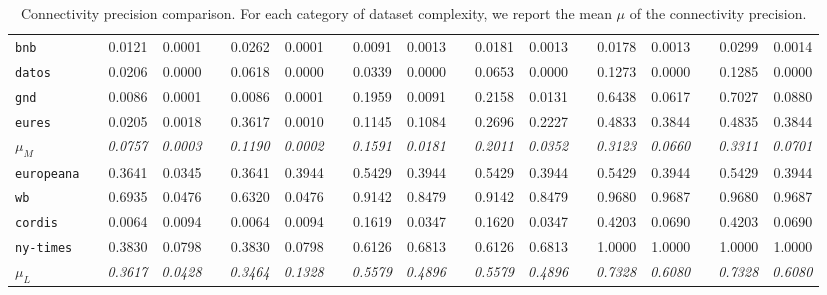 \begin{table}
{\begin{tabular}{lc@{\hs}rrc@{\hs}rrc@{\hs}rrc@{\hs}rrc@{\hs}rrc@{\hs}rr}
\texttt{bnb} & \phantom{a} & 0.0121 & 0.0001 & \phantom{a} & 0.0262 & 0.0001 & \phantom{a} & 0.0091 & 0.0013  & \phantom{a} & 0.0181 & 0.0013 & \phantom{a} & 0.0178 & 0.0013 & \phantom{a} & 0.0299 & 0.0014 \\
\texttt{datos} & \phantom{a} & 0.0206 & 0.0000 & \phantom{a} & 0.0618 & 0.0000 & \phantom{a} & 0.0339 & 0.0000  & \phantom{a} & 0.0653 & 0.0000 & \phantom{a} & 0.1273 & 0.0000 & \phantom{a} & 0.1285 & 0.0000 \\
\texttt{gnd} & \phantom{a} & 0.0086 & 0.0001 & \phantom{a} & 0.0086 & 0.0001 & \phantom{a} & 0.1959 & 0.0091  & \phantom{a} & 0.2158 & 0.0131 & \phantom{a} & 0.6438 & 0.0617 & \phantom{a} & 0.7027 & 0.0880 \\
\texttt{eures} & \phantom{a} & 0.0205 & 0.0018 & \phantom{a} & 0.3617 & 0.0010 & \phantom{a} & 0.1145 & 0.1084  & \phantom{a} & 0.2696 & 0.2227 & \phantom{a} & 0.4833 & 0.3844 & \phantom{a} & 0.4835 & 0.3844 \\
$\mu_M$ & \phantom{a} & \emph{0.0757} & \emph{0.0003} & \phantom{a} & \emph{0.1190} & \emph{0.0002} & \phantom{a} & \emph{0.1591} & \emph{0.0181} & \phantom{a} & \emph{0.2011} & \emph{0.0352} & \phantom{a} & \emph{0.3123} & \emph{0.0660} & \phantom{a} & \emph{0.3311} & \emph{0.0701} \\
\midrule
\texttt{europeana} & \phantom{a} & 0.3641 & 0.0345 & \phantom{a} & 0.3641 & 0.3944 & \phantom{a} & 0.5429 & 0.3944  & \phantom{a} & 0.5429 & 0.3944 & \phantom{a} & 0.5429 & 0.3944 & \phantom{a} & 0.5429 & 0.3944 \\
\texttt{wb} & \phantom{a} & 0.6935 & 0.0476 & \phantom{a} & 0.6320 & 0.0476 & \phantom{a} & 0.9142 & 0.8479  & \phantom{a} & 0.9142 & 0.8479 & \phantom{a} & 0.9680 & 0.9687 & \phantom{a} & 0.9680 & 0.9687 \\
\texttt{cordis} & \phantom{a} & 0.0064 & 0.0094 & \phantom{a} & 0.0064 & 0.0094 & \phantom{a} & 0.1619 & 0.0347  & \phantom{a} & 0.1620 & 0.0347 & \phantom{a} & 0.4203 & 0.0690 & \phantom{a} & 0.4203 & 0.0690 \\
\texttt{ny-times} & \phantom{a} & 0.3830 & 0.0798 & \phantom{a} & 0.3830 & 0.0798 & \phantom{a} & 0.6126 & 0.6813  & \phantom{a} & 0.6126 & 0.6813 & \phantom{a} & 1.0000 & 1.0000 & \phantom{a} & 1.0000 & 1.0000 \\
$\mu_L$ & \phantom{a} & \emph{0.3617} & \emph{0.0428} & \phantom{a} & \emph{0.3464} & \emph{0.1328} & \phantom{a} & \emph{0.5579} & \emph{0.4896} & \phantom{a} & \emph{0.5579} & \emph{0.4896} & \phantom{a} & \emph{0.7328} & \emph{0.6080} & \phantom{a} & \emph{0.7328} & \emph{0.6080} \\
\bottomrule
\end{tabular}
}
\caption{Connectivity precision comparison. For each category of dataset complexity, we report the mean $\mu$ of the connectivity precision.}
\label{tab:precision-conn}
\end{table}
